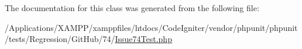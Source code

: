 The documentation for this class was generated from the following file\+:\begin{DoxyCompactItemize}
\item 
/\+Applications/\+X\+A\+M\+P\+P/xamppfiles/htdocs/\+Code\+Igniter/vendor/phpunit/phpunit/tests/\+Regression/\+Git\+Hub/74/\mbox{\hyperlink{_issue74_test_8php}{Issue74\+Test.\+php}}\end{DoxyCompactItemize}
